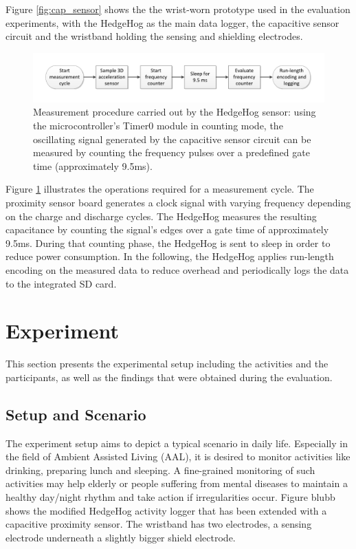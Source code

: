 \documentclass[runningheads,a4paper]{llncs}
\begin{document}
Figure \ref{fig:cap_sensor} shows the the wrist-worn prototype used in the evaluation experiments, with the HedgeHog as the main data logger, the capacitive sensor circuit and the wristband holding the sensing and shielding electrodes.

\begin{figure}
	\centering
 		\includegraphics[trim=1cm 1cm 1cm 1cm,clip,width=\textwidth]{Images/pseudocode.pdf}
	\caption{Measurement procedure carried out by the HedgeHog sensor: using the microcontroller's Timer0 module in counting mode, the oscillating signal generated by the capacitive sensor circuit can be measured by counting the frequency pulses over a predefined gate time (approximately 9.5ms).}
	\label{fig:pseudocode}
\end{figure}

Figure \ref{fig:pseudocode} illustrates the operations required for a measurement cycle. The proximity sensor board generates a clock signal with varying frequency depending on the charge and discharge cycles. The HedgeHog measures the resulting capacitance by counting the signal's edges over a gate time of approximately 9.5ms. During that counting phase, the HedgeHog is sent to sleep in order to reduce power consumption. In the following, the HedgeHog applies run-length encoding on the measured data to reduce overhead and periodically logs the data to the integrated SD card.

\section{Experiment}
\label{sect:experiment}

This section presents the experimental setup including the activities and the participants, as well as the findings that were obtained during the evaluation.

\subsection{Setup and Scenario}

The experiment setup aims to depict a typical scenario in daily life. Especially in the field of Ambient Assisted Living (AAL), it is desired to monitor activities like drinking, preparing lunch and sleeping. A fine-grained monitoring of such activities may help elderly or people suffering from mental diseases to maintain a healthy day/night rhythm and take action if irregularities occur. Figure blubb shows the modified HedgeHog activity logger that has been extended with a capacitive proximity sensor. The wristband has two electrodes, a sensing electrode underneath a slightly bigger shield electrode. 
\end{document}

